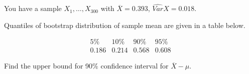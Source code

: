 
\begin{question}
You have a sample \(X_1, \dots, X_{300}\) with \(\overline{X}= 0.393\), \(\widehat{Var}{X} = 0.018\).

Quantiles of bootstrap distribution of sample mean are given in a table below.

\[
\begin{array}{c|c|c|c}
5 \% & 10 \% & 90 \% & 95 \% \\
\hline
0.186 & 0.214 & 0.568 & 0.608
\end{array}
\]

Find the upper bound for 90\% confidence interval for \(\overline{X}-\mu\).
\end{question}



